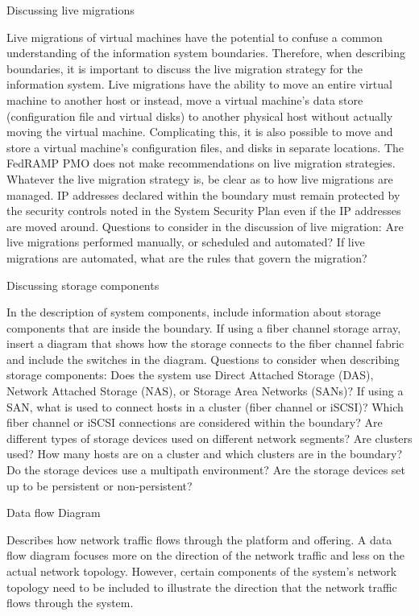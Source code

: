 \documentclass[../main.tex]{subfiles}
\begin{document}
Discussing live migrations

Live migrations of virtual machines have the potential to confuse a common understanding of the information system boundaries. Therefore, when describing boundaries, it is important to discuss the live migration strategy for the information system. Live migrations have the ability to move an entire virtual machine to another host or instead, move a virtual machine’s data store (configuration file and virtual disks) to another physical host without actually moving the virtual machine. Complicating this, it is also possible to move and store a virtual machine’s configuration files, and disks in separate locations. The FedRAMP PMO does not make recommendations on live migration strategies. Whatever the live migration strategy is, be clear as to how live migrations are managed.
IP addresses declared within the boundary must remain protected by the security controls noted in the System Security Plan even if the IP addresses are moved around.
Questions to consider in the discussion of live migration:
Are live migrations performed manually, or scheduled and automated?
If live migrations are automated, what are the rules that govern the migration?

Discussing storage components

In the description of system components, include information about storage components that are inside the boundary. If using a fiber channel storage array, insert a diagram that shows how the storage connects to the fiber channel fabric and include the switches in the diagram.
Questions to consider when describing storage components:
Does the system use Direct Attached Storage (DAS), Network Attached Storage (NAS), or Storage Area Networks (SANs)?
If using a SAN, what is used to connect hosts in a cluster (fiber channel or iSCSI)?
Which fiber channel or iSCSI connections are considered within the boundary?
Are different types of storage devices used on different network segments?
Are clusters used?
How many hosts are on a cluster and which clusters are in the boundary?
Do the storage devices use a multipath environment?
Are the storage devices set up to be persistent or non-persistent?

Data flow Diagram

Describes how network traffic flows through the platform and offering.
A data flow diagram focuses more on the direction of the network traffic and less on the actual network topology. However, certain components of the system’s network topology need to be included to illustrate the direction that the network traffic flows through the system.
\end{document}
